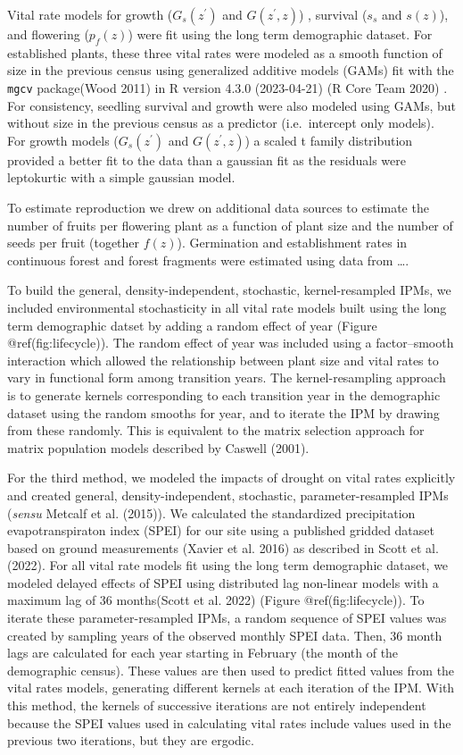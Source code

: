 \documentclass[
]{article}
\begin{document}
Vital rate models for growth (\(G_s(z^\prime)\) and \(G(z^\prime, z)\))
, survival (\(s_s\) and \(s(z)\)), and flowering (\(p_f(z)\)) were fit
using the long term demographic dataset. For established plants, these
three vital rates were modeled as a smooth function of size in the
previous census using generalized additive models (GAMs) fit with the
\texttt{mgcv} package(Wood 2011) in R version 4.3.0 (2023-04-21) (R Core
Team 2020) . For consistency, seedling survival and growth were also
modeled using GAMs, but without size in the previous census as a
predictor (i.e.~intercept only models). For growth models
(\(G_s(z^\prime)\) and \(G(z^\prime, z)\)) a scaled t family
distribution provided a better fit to the data than a gaussian fit as
the residuals were leptokurtic with a simple gaussian model.

To estimate reproduction we drew on additional data sources to estimate
the number of fruits per flowering plant as a function of plant size and
the number of seeds per fruit (together \(f(z)\)). Germination and
establishment rates in continuous forest and forest fragments were
estimated using data from \ldots.

To build the general, density-independent, stochastic, kernel-resampled
IPMs, we included environmental stochasticity in all vital rate models
built using the long term demographic datset by adding a random effect
of year (Figure @ref(fig:lifecycle)). The random effect of year was
included using a factor--smooth interaction which allowed the
relationship between plant size and vital rates to vary in functional
form among transition years. The kernel-resampling approach is to
generate kernels corresponding to each transition year in the
demographic dataset using the random smooths for year, and to iterate
the IPM by drawing from these randomly. This is equivalent to the matrix
selection approach for matrix population models described by Caswell
(2001).

For the third method, we modeled the impacts of drought on vital rates
explicitly and created general, density-independent, stochastic,
parameter-resampled IPMs (\emph{sensu} Metcalf et al. (2015)). We
calculated the standardized precipitation evapotranspiraton index (SPEI)
for our site using a published gridded dataset based on ground
measurements (Xavier et al. 2016) as described in Scott et al. (2022).
For all vital rate models fit using the long term demographic dataset,
we modeled delayed effects of SPEI using distributed lag non-linear
models with a maximum lag of 36 months(Scott et al. 2022) (Figure
@ref(fig:lifecycle)). To iterate these parameter-resampled IPMs, a
random sequence of SPEI values was created by sampling years of the
observed monthly SPEI data. Then, 36 month lags are calculated for each
year starting in February (the month of the demographic census). These
values are then used to predict fitted values from the vital rates
models, generating different kernels at each iteration of the IPM. With
this method, the kernels of successive iterations are not entirely
independent because the SPEI values used in calculating vital rates
include values used in the previous two iterations, but they are
ergodic.
\end{document}
